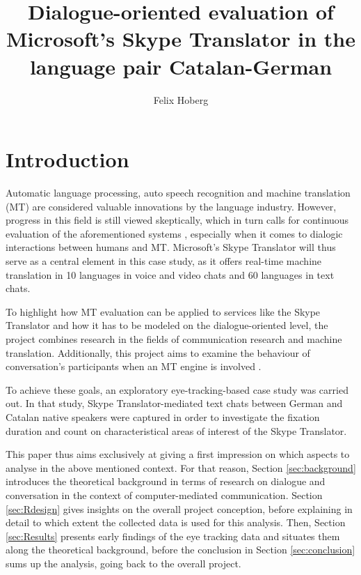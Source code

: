 \documentclass[output=paper]{langscibook}
\author{Felix Hoberg\affiliation{Leipzig University}}
\title[Dialogue-oriented evaluation of MS Skype Translator for Catalan-German]{Dialogue-oriented evaluation of Microsoft's Skype Translator in the language pair Catalan-German}
\begin{document}
\renewcommand{\lsChapterFooterSize}{\footnotesize}
\maketitle

\section{Introduction} 

Automatic language processing, auto speech recognition and machine translation (MT) are considered valuable innovations by the language industry. However, progress in this field is still viewed skeptically, which in turn calls for continuous evaluation of the aforementioned systems \citep[i.e.][]{ramlow_maschinelle_2009, bowker_machine_2019}, especially when it comes to dialogic interactions between humans and MT. Microsoft’s Skype Translator will thus serve as a central element in this case study, as it offers real-time machine translation in 10 languages in voice and video chats and 60 languages in text chats.

To highlight how MT evaluation can be applied to services like the Skype Translator and how it has to be modeled on the dialogue-oriented level, the project combines research in the fields of communication research \citep{beiswenger_sprachhandlungskoordination_2007} and machine translation. Additionally, this project aims to examine the behaviour of conversation's participants when an MT engine is involved \citep{fiser_investigating_2017}.

To achieve these goals, an exploratory eye-tracking-based case study was carried out. In that study, Skype Translator-mediated text chats between German and Catalan native speakers were captured in order to investigate the fixation duration and count on characteristical areas of interest of the Skype Translator. 

This paper thus aims exclusively at giving a first impression on which aspects to analyse in the above mentioned context. For that reason, Section \ref{sec:background} introduces the theoretical background in terms of research on dialogue and conversation in the context of computer-mediated communication. Section \ref{sec:Rdesign} gives insights on the overall project conception, before explaining in detail to which extent the collected data is used for this analysis. Then, Section \ref{sec:Results} presents early findings of the eye tracking data and situates them along the theoretical background, before the conclusion in Section \ref{sec:conclusion} sums up the analysis, going back to the overall project.
\end{document}
